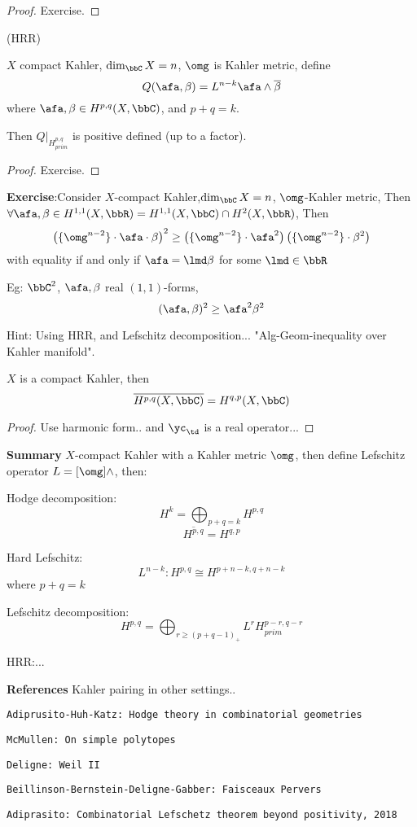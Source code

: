 \begin{proof}
Exercise.
\end{proof}

\begin{thm}(HRR)

$X$ compact Kahler, $\dim_\bbC X=n$, $\omg$ is Kahler metric, define 
$$Q(\afa,\beta)=L^{n-k}\afa\wedge\overline{\beta}$$
where $\afa,\beta\in H^{p,q}(X,\bbC)$, and $p+q=k$.

Then $Q|_{H_{prim}^{p,q}}$ is positive defined (up to a factor).
\end{thm}

\begin{proof}
Exercise.
\end{proof}

\textbf{Exercise}:Consider $X$-compact Kahler,$\dim_\bbC X=n$, $\omg$-Kahler metric, 
Then $\forall\afa,\beta\in H^{1,1}(X,\bbR)=H^{1,1}(X,\bbC)\cap H^2(X,\bbR)$,
Then
$$
  \left(
    \{\omg^{n-2}\}\cdot\afa\cdot\beta
  \right)^2
\geq
  \left(
    \{\omg^{n-2}\}\cdot\afa^2
  \right)
  \left(
    \{\omg^{n-2}\}\cdot\beta^2
  \right)
$$ 
with equality if and only if $\afa=\lmd\beta$ for some $\lmd\in \bbR$

Eg: $\bbC^2$, $\afa,\beta$ real $(1,1)$-forms,
$$(\afa,\beta)^2\geq \afa^2\beta^2$$

Hint: Using HRR, and Lefschitz decomposition... 
"Alg-Geom-inequality over Kahler manifold".

\begin{prop}
$X$ is a compact Kahler, then 
$$\overline{H^{p,q}(X,\bbC)}=H^{q,p}(X,\bbC)$$
\end{prop}
\begin{proof}
Use harmonic form.. and $\yc_\td$ is a real operator...
\end{proof}

\textbf{Summary} $X$-compact Kahler with a Kahler metric $\omg$, then 
define Lefschitz operator $L=[\omg]\wedge$, then:

Hodge decomposition:
$$H^k=\bigoplus_{p+q=k}H^{p,q}$$
$$\overline{H^{p,q}}=H^{q,p}$$

Hard Lefschitz: 
$$L^{n-k}:H^{p,q}\cong H^{p+n-k,q+n-k}$$
where $p+q=k$

Lefschitz decomposition:
$$H^{p,q}=\bigoplus_{r\geq(p+q-1)_+} L^r H^{p-r,q-r}_{prim}$$

HRR:...

\textbf{References}
Kahler pairing in other settings..

\verb"Adiprusito-Huh-Katz: Hodge theory in combinatorial geometries"

\verb"McMullen: On simple polytopes"

\verb"Deligne: Weil II"

\verb"Beillinson-Bernstein-Deligne-Gabber: Faisceaux Pervers"

\verb"Adiprasito: Combinatorial Lefschetz theorem beyond positivity, 2018"












